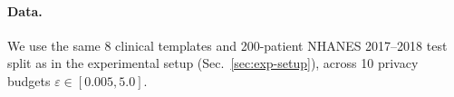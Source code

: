 
\paragraph{Data.} We use the same 8 clinical templates and 200-patient NHANES 2017--2018 test split as in the experimental setup (Sec.~\ref{sec:exp-setup}), across 10 privacy budgets $\varepsilon \in [0.005, 5.0]$.



